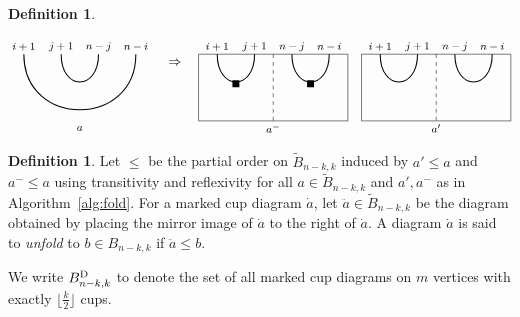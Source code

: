 \documentclass[11pt,reqno]{amsart}
\numberwithin{equation}{section}
\theoremstyle{definition}
\newtheorem{definition}[theorem]{Definition}
\newcommand{\BD}{{B}^\textup{D}}
\newcommand{\da}{\dot{a}}
\newcommand{\red}[1]{{\color{red}#1}}
\newcommand{\tB}{\widetilde{B}}
\newcommand{\ZZ}{\mathbb{Z}}
\begin{document}
\begin{definition}
\begin{enumerate}
\[\begin{tikzpicture}[baseline={(0,-.3)}]
\begin{footnotesize}
\node at (0,.2) {$i+1$};
\node at (1,.2) {$j+1$};
\node at (2,.2) {$n-j$};
\node at (3,.2) {$n-i$};
\node at (1.5, -2) {$a$};
\end{footnotesize}
\draw[thick] (1,0) .. controls +(0,-1) and +(0,-1) .. +(1,0);
\draw[thick] (0,0) .. controls +(0,-2) and +(0,-2) .. +(3,0);
\end{tikzpicture}
\quad
\Rightarrow
\quad
\begin{tikzpicture}[baseline={(0,-.3)}]
\draw (-.5,0) -- (3.5,0) -- (3.5,-1.8) -- (-.5,-1.8) -- cycle;
\draw[dashed] (1.5,0)--(1.5,-1.8);
\begin{footnotesize}
\node at (0,.2) {$i+1$};
\node at (1,.2) {$j+1$};
\node at (2,.2) {$n-j$};
\node at (3,.2) {$n-i$};
\node at (.5, -0.8) {$\blacksquare$};
\node at (2.5, -0.8) {$\blacksquare$};
\node at (1.5, -2) {$a^-$};
\end{footnotesize}
\draw[thick] (0,0) .. controls +(0,-1) and +(0,-1) .. +(1,0);
\draw[thick] (2,0) .. controls +(0,-1) and +(0,-1) .. +(1,0);
\end{tikzpicture}
\quad
\begin{tikzpicture}[baseline={(0,-.3)}]
\draw (-.5,0) -- (3.5,0) -- (3.5,-1.8) -- (-.5,-1.8) -- cycle;
\draw[dashed] (1.5,0)--(1.5,-1.8);
\begin{footnotesize}
\node at (0,.2) {$i+1$};
\node at (1,.2) {$j+1$};
\node at (2,.2) {$n-j$};
\node at (3,.2) {$n-i$};
\node at (1.5, -2) {$a'$};
\end{footnotesize}
\draw[thick] (0,0) .. controls +(0,-1) and +(0,-1) .. +(1,0);
\draw[thick] (2,0) .. controls +(0,-1) and +(0,-1) .. +(1,0);
\end{tikzpicture}
\]
\end{enumerate}
\endalg
\begin{definition}\label{def:unfold}
Let $\leq$ be the partial order on $\tB_{n-k,k}$ induced by $a' \leq a$ and $a^- \leq a$ using transitivity and reflexivity for all $a \in \tB_{n-k,k}$ and $a', a^-$ as in Algorithm~\ref{alg:fold}.
For a marked cup diagram $\da$, let $\ddot{a} \in \tB_{n-k,k}$ be the diagram obtained by placing the mirror image of $\da$ to the right of $\da$.
A diagram $\da$ is said to {\em unfold} to $b \in B_{n-k,k}$ if $\ddot{a} \leq b$.
\end{definition}

We write $\BD_{n-k,k}$ to denote the set of all marked cup diagrams on $m$ vertices with exactly $\lfloor\frac{k}{2}\rfloor$ cups.

\end{definition}  
\end{document}
